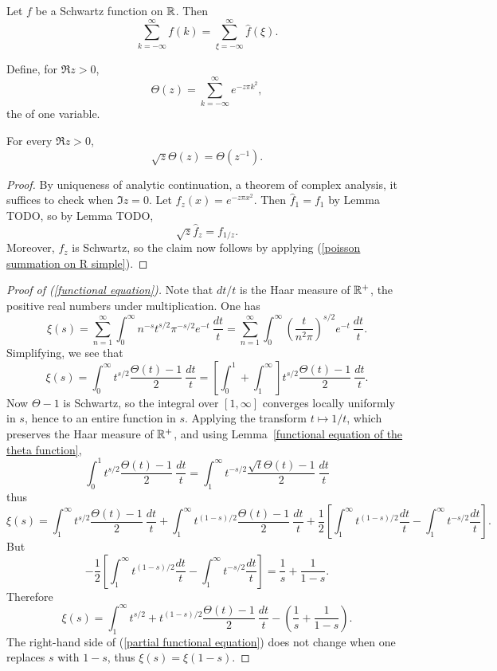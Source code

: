 \begin{corollary}
Let $f$ be a Schwartz function on $\mathbb{R}$. Then
\begin{equation}\label{poisson summation on R simple}
\sum_{k=-\infty}^{\infty} f(k) = \sum_{\xi = -\infty}^{\infty} \hat f(\xi).
\end{equation}
\end{corollary}

\begin{definition}
Define, for $\Re z > 0$,
\[\Theta(z) = \sum_{k=-\infty}^{\infty} e^{-z\pi k^2},\]
the  of one variable.
\end{definition}

\begin{lemma}\label{functional equation of the theta function}
For every $\Re z > 0$,
\[\sqrt z \Theta(z) = \Theta(z^{-1}).\]
\end{lemma}
\begin{proof}
By uniqueness of analytic continuation, a theorem of complex analysis, it suffices to check when $\Im z = 0$. Let $f_z(x) = e^{-z\pi x^2}$. Then $\hat f_1 = f_1$ by Lemma TODO, so by Lemma TODO,
\[\sqrt z \hat f_{z} = f_{1/z}.\]
Moreover, $f_z$ is Schwartz, so the claim now follows by applying (\ref{poisson summation on R simple}).
\end{proof}

\begin{proof}[Proof of (\ref{functional equation})]
Note that $dt/t$ is the Haar measure of $\mathbb{R}^+$, the positive real numbers under multiplication. One has
\[\xi(s) = \sum_{n=1}^{\infty} \int_0^{\infty} n^{-s} t^{s/2} \pi^{-s/2} e^{-t}~\frac{dt}{t} = \sum_{n=1}^{\infty} \int_0^{\infty} \left(\frac{t}{n^2\pi}\right)^{s/2}e^{-t}~\frac{dt}{t}.\]
Simplifying, we see that
\[\xi(s) = \int_0^{\infty} t^{s/2} \frac{\Theta(t) - 1}{2}~\frac{dt}{t} = \left[\int_0^1 + \int_1^{\infty} \right]t^{s/2} \frac{\Theta(t) - 1}{2}~\frac{dt}{t}.\]
Now $\Theta - 1$ is Schwartz, so the integral over $[1, \infty]$ converges locally uniformly in $s$, hence to an entire function in $s$.
Applying the transform $t \mapsto 1/t$, which preserves the Haar measure of $\mathbb{R}^+$, and using Lemma~\ref{functional equation of the theta function},
\[\int_0^1 t^{s/2} \frac{\Theta(t) - 1}{2}~\frac{dt}{t} = \int_1^{\infty} t^{-s/2} \frac{\sqrt t \Theta(t) - 1}{2}~\frac{dt}{t}\]
thus
\[\xi(s) = \int_1^{\infty} t^{s/2} \frac{\Theta(t) - 1}{2}~\frac{dt}{t} + \int_1^{\infty} t^{(1-s)/2} \frac{\Theta(t) - 1}{2}~\frac{dt}{t} + \frac{1}{2} \left[\int_1^{\infty} t^{(1-s)/2} \frac{dt}{t} - \int_1^{\infty} t^{-s/2}\frac{dt}{t} \right].\]
But
\[-\frac{1}{2} \left[\int_1^{\infty} t^{(1-s)/2} \frac{dt}{t} - \int_1^{\infty} t^{-s/2}\frac{dt}{t} \right] = \frac{1}{s} + \frac{1}{1-s}.\]
Therefore
\begin{equation}\label{partial functional equation}
\xi(s) = \int_1^{\infty} t^{s/2} + t^{(1-s)/2}\frac{\Theta(t) - 1}{2} ~\frac{dt}{t} - \left(\frac{1}{s} + \frac{1}{1-s}\right).
\end{equation}
The right-hand side of (\ref{partial functional equation}) does not change when one replaces $s$ with $1-s$, thus $\xi(s) = \xi(1-s)$.
\end{proof}
